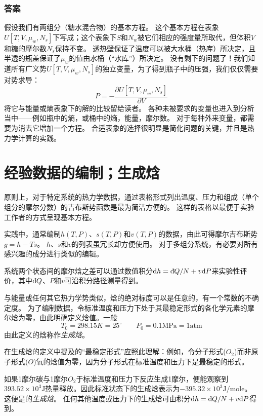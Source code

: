 \subsubsection*{答案}
假设我们有两组分（糖水混合物）的基本方程。
这个基本方程在表象$U[T, V, \mu_{w}, N_{s}]$下写成；这个表象下$S$和$N_{w}$被它们相应的强度量所取代，但体积$V$和糖的摩尔数$N_{s}$保持不变。
透热壁保证了温度可以被大水桶（热库）所决定，且半透的瓶盖保证了$\mu_{w}$的值由水桶（“水库”）所决定。
没有剩下的问题了！我们知道所有广义势$U[T, V, \mu_{w}, N_{s}]$的独立变量，为了得到瓶子中的压强，我们仅仅需要对势求导：
\[ P=-\frac{\partial U[T, V, \mu_{w}, N_{s}]}{\partial V} \]
将它与能量或熵表象下的解的比较留给读者。
各种未被要求的变量也进入到分析当中——例如瓶中的熵，或桶中的熵，能量，摩尔数。
对于每种外来变量，都需要为消去它增加一个方程。
合适表象的选择很明显是简化问题的关键，并且是热力学计算的实践。


\section{经验数据的编制；生成焓}
\label{sec6.6}

原则上，对于特定系统的热力学数据，通过表格形式列出温度、压力和组成（单个组分的摩尔分数）的吉布斯势函数是最为简洁方便的。
这样的表格以最便于实验工作者的方式呈现基本方程。

实践中，通常编制$h(T,P)$、$s(T,P)$和$v(T,P)$的数据，由此可得摩尔吉布斯势$g=h-Ts$。
$h$、$s$和$v$的列表虽冗长却方便使用。
对于多组分系统，有必要对所有感兴趣的成分进行类似的编辑。

系统两个状态间的摩尔焓之差可以通过数值积分$\mathrm{d} h=\mathrm d\hspace*{-0.1em}\bar{}\hspace*{0.08em} Q/N+v \mathrm{d}  P$来实验性评价，其中$\mathrm d\hspace*{-0.1em}\bar{}\hspace*{0.08em} Q$、$P$和$v$可沿积分路径测量得到。


与能量或任何其它热力学势类似，焓的绝对标度可以是任意的，有一个常数的不确定度。
为了编制数据，令标准温度和压力下处于其最稳定形式的各化学元素的摩尔焓为零，由此明确定义焓值。一般
\[ T_0 = 298.15K = 25^{\circ}\qquad P_0 = 0.1 \text{MPa} = 1 \text{atm} \]
由此定义的焓称作\textit{生成焓}。

在生成焓的定义中提及的“最稳定形式”应照此理解：例如，令分子形式($O_2$)而非原子形式($O$)氧的焓值为零，因为分子形式在标准温度和压力下是最稳定的形式。

如果1摩尔碳与1摩尔$O_2$于标准温度和压力下反应生成1摩尔，便能观察到$393.52\times10^3\text{J}$热量释放。因此标准状态下的生成焓表示为$-395.32\times10^3\text{J}/\text{mole}$。
这便是的\textit{生成焓}。
任何其他温度或压力下的生成焓可由积分$\mathrm{d} h=\mathrm d\hspace*{-0.1em}\bar{}\hspace*{0.08em} Q/N+v\mathrm{d} P$得到。


